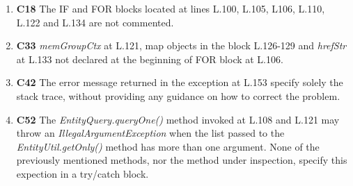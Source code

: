 \begin{enumerate}
	\item \textbf{C18} The IF and FOR blocks located at lines L.100, L.105, L106, L.110, L.122 and L.134 are not commented.

	\item \textbf{C33} \textit{memGroupCtx} at L.121, map objects in the block L.126-129 and \textit{hrefStr} at L.133 not declared at the beginning of FOR block at L.106.

	\item \textbf{C42} The error message returned in the exception at L.153 specify solely the stack trace, without providing any guidance on how to correct the problem.

	\item \textbf{C52} The \textit{EntityQuery.queryOne()} method invoked at L.108 and L.121 may throw an \textit{IllegalArgumentException} when the list passed to the \textit{EntityUtil.getOnly()} method has more than one argument.
None of the previously mentioned methods, nor the method under inspection, specify this expection in a try/catch block.
\end{enumerate}
